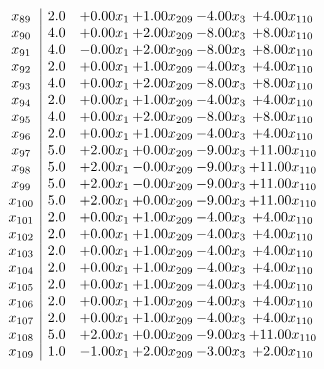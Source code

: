 \documentclass[8pt]{article}
\begin{document}
\[\begin{array}{c| c c@{\hskip 2pt} c@{\hskip 2pt} c@{\hskip 2pt} c@{\hskip 2pt} }
 x_{89}   &  2.0 & +  0.00 x_{1} & +  1.00 x_{209} & -4.00 x_{3} & +  4.00 x_{110}\\
 x_{90}   &  4.0 & +  0.00 x_{1} & +  2.00 x_{209} & -8.00 x_{3} & +  8.00 x_{110}\\
 x_{91}   &  4.0 & -0.00 x_{1} & +  2.00 x_{209} & -8.00 x_{3} & +  8.00 x_{110}\\
 x_{92}   &  2.0 & +  0.00 x_{1} & +  1.00 x_{209} & -4.00 x_{3} & +  4.00 x_{110}\\
 x_{93}   &  4.0 & +  0.00 x_{1} & +  2.00 x_{209} & -8.00 x_{3} & +  8.00 x_{110}\\
 x_{94}   &  2.0 & +  0.00 x_{1} & +  1.00 x_{209} & -4.00 x_{3} & +  4.00 x_{110}\\
 x_{95}   &  4.0 & +  0.00 x_{1} & +  2.00 x_{209} & -8.00 x_{3} & +  8.00 x_{110}\\
 x_{96}   &  2.0 & +  0.00 x_{1} & +  1.00 x_{209} & -4.00 x_{3} & +  4.00 x_{110}\\
 x_{97}   &  5.0 & +  2.00 x_{1} & +  0.00 x_{209} & -9.00 x_{3} & + 11.00 x_{110}\\
 x_{98}   &  5.0 & +  2.00 x_{1} & -0.00 x_{209} & -9.00 x_{3} & + 11.00 x_{110}\\
 x_{99}   &  5.0 & +  2.00 x_{1} & -0.00 x_{209} & -9.00 x_{3} & + 11.00 x_{110}\\
 x_{100}   &  5.0 & +  2.00 x_{1} & +  0.00 x_{209} & -9.00 x_{3} & + 11.00 x_{110}\\
 x_{101}   &  2.0 & +  0.00 x_{1} & +  1.00 x_{209} & -4.00 x_{3} & +  4.00 x_{110}\\
 x_{102}   &  2.0 & +  0.00 x_{1} & +  1.00 x_{209} & -4.00 x_{3} & +  4.00 x_{110}\\
 x_{103}   &  2.0 & +  0.00 x_{1} & +  1.00 x_{209} & -4.00 x_{3} & +  4.00 x_{110}\\
 x_{104}   &  2.0 & +  0.00 x_{1} & +  1.00 x_{209} & -4.00 x_{3} & +  4.00 x_{110}\\
 x_{105}   &  2.0 & +  0.00 x_{1} & +  1.00 x_{209} & -4.00 x_{3} & +  4.00 x_{110}\\
 x_{106}   &  2.0 & +  0.00 x_{1} & +  1.00 x_{209} & -4.00 x_{3} & +  4.00 x_{110}\\
 x_{107}   &  2.0 & +  0.00 x_{1} & +  1.00 x_{209} & -4.00 x_{3} & +  4.00 x_{110}\\
 x_{108}   &  5.0 & +  2.00 x_{1} & +  0.00 x_{209} & -9.00 x_{3} & + 11.00 x_{110}\\
 x_{109}   &  1.0 & -1.00 x_{1} & +  2.00 x_{209} & -3.00 x_{3} & +  2.00 x_{110}\\

\end{array}\]
\end{document}
